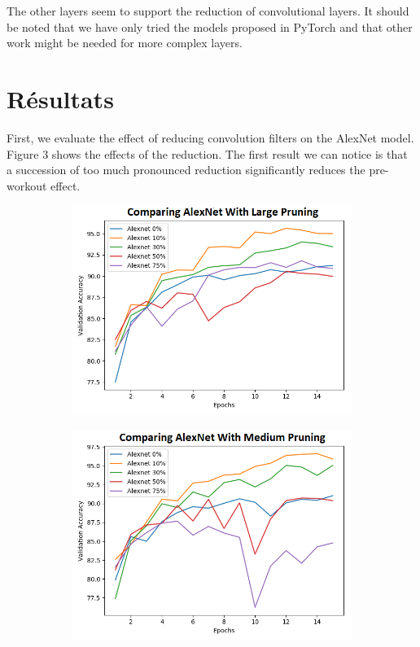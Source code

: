 \documentclass[12pt]{article}
\begin{document}
The other layers seem to support the reduction of convolutional layers. It should be noted that we have only tried the models proposed in PyTorch and that other work might be needed for more complex layers.

\section*{Résultats}
First, we evaluate the effect of reducing convolution filters on the AlexNet model. Figure 3 shows the effects of the reduction. The first result we can notice is that a succession of too much pronounced reduction significantly reduces the pre-workout effect.
\begin{figure}[H]
	\centering
	\begin{subfigure}[b]{0.33\textwidth}            
		\includegraphics[width=\textwidth]{prune_ratio_rough}
		\label{fig:pruneratiorough}
	\end{subfigure}%
	\begin{subfigure}[b]{0.33\textwidth}
		\centering
		\includegraphics[width=\textwidth]{prune_ratio_medium}

\end{subfigure}
\end{figure}
\end{document}
